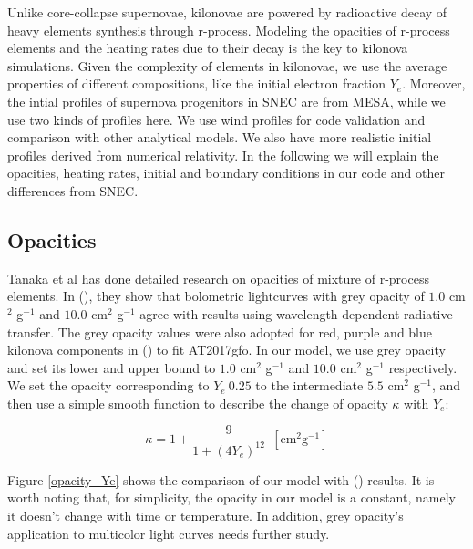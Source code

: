 \documentclass[fleqn,usenatbib]{mnras}
\begin{document}
    Unlike core-collapse supernovae, kilonovae are powered by radioactive decay of heavy elements synthesis through r-process. Modeling the opacities of r-process elements and the heating rates due to their decay is the key to kilonova simulations. Given the complexity of elements in kilonovae, we use the average properties of different compositions, like the initial electron fraction $Y_e$. Moreover, the intial profiles of supernova progenitors in SNEC are from MESA, while we use two kinds of profiles here. We use wind profiles for code validation and comparison with other analytical models. We also have more realistic initial profiles derived from numerical relativity. In the following we will explain the opacities, heating rates, initial and boundary conditions in our code and other differences from SNEC.
    

    \subsection{Opacities} 
     Tanaka et al has done detailed research on opacities of mixture of r-process elements. In (\cite{tanaka2018properties}),  they show that bolometric lightcurves with grey opacity of $1.0$ cm$^2$ g$^{-1}$ and $10.0$ cm$^2$ g$^{-1}$ agree with results using wavelength-dependent radiative transfer. The grey opacity values were also adopted for red, purple and blue kilonova components in (\cite{villar2017combined}) to fit AT2017gfo. In our model, we use grey opacity and set its lower and upper bound to $1.0$ cm$^2$ g$^{-1}$ and $10.0$ cm$^2$ g$^{-1}$ respectively. We set the opacity corresponding to $Y_e \ 0.25$ to the intermediate $5.5$ cm$^2$ g$^{-1}$, and then use a simple smooth function to describe the change of opacity $\kappa$ with $Y_e$:
        
    
    \begin{equation}
    	\label{opacity_ye}
    	\kappa = 1 + \frac{9}{1+(4Y_e)^{12}}~~ \mathrm{ [cm^2 g^{-1}]}
    \end{equation}
    
    Figure \ref{opacity_Ye} shows the comparison of our model with (\cite{tanaka2020systematic}) results. It is worth noting that, for simplicity, the opacity in our model is a constant, namely it doesn't change with time or temperature. In addition, grey opacity's application to multicolor light curves needs further study.
   
\end{document}
